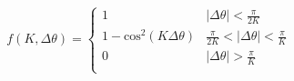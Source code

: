 \documentclass[12pt]{article}
\begin{document}
$$
f(K,\Delta\theta) =
\begin{cases}
1                & |\Delta \theta |< \frac{\pi}{2K} \\
1-\text{cos}^2(K \Delta\theta)  & \frac{\pi}{2K} < |\Delta \theta| < \frac{\pi}{K} \\
0 & | \Delta \theta | > \frac{\pi}{K}\\
\end{cases}
$$
\end{document}
